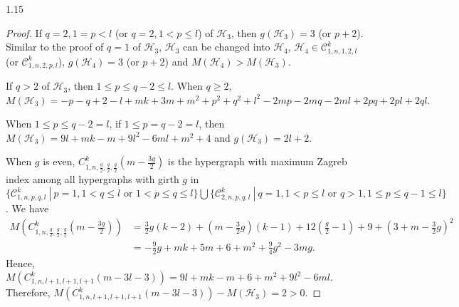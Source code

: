 \documentclass[preprint,12pt]{elsarticle1}
\numberwithin{equation}{section}
\begin{document}
\begin{spacing}{1.15}
\begin{proof}
If $q=2, 1=p<l$ (or $q=2, 1<p\leq l$) of $\mathcal{H}_{3}$, then $g(\mathcal{H}_{3})=3$ (or $p+2$). Similar to the proof of $q=1$ of $\mathcal{H}_{3}$, $\mathcal{H}_{3}$ can be changed into $\mathcal{H}_{4}$,
$\mathcal{H}_{4}\in \mathcal{C}_{1,n,1,2,l}^{k}$ (or $\mathcal{C}_{1,n,2,p,l}^{k}$), $g(\mathcal{H}_{4})=3$ (or $p+2$) and $M(\mathcal{H}_{4})>M(\mathcal{H}_{3})$.



If $q>2$ of $\mathcal{H}_{3}$, then $1\leq p\leq q-2\leq l$.
When $q\geq 2$, $M(\mathcal{H}_{3})=-p-q+2-l+mk+3m+m^{2}+p^{2}+q^{2}+l^{2}-2mp-2mq-2ml+2pq+2pl+2ql.$

When $1\leq p\leq q-2=l$, if $1\leq p=q-2=l$, then $M(\mathcal{H}_{3})=9l+mk-m+9l^{2}-6ml+m^{2}+4$ and $g(\mathcal{H}_{3})=2l+2.$

When $g$ is even, $C_{1,n,\frac{g}{2},\frac{g}{2},\frac{g}{2}}^{k}(m-\frac{3g}{2})$ is the hypergraph with maximum Zagreb index among all hypergraphs with girth $g$ in $\{\mathcal{C}_{1,n,p,q,l}^{k} ~|~ p=1,1<q\leq l \text{~or~} 1<p\leq q\leq l\} \bigcup \{\mathcal{C}_{2,n,p,q,l}^{k}~|~ q=1,1<p\leq l \text{~or~} q>1, 1\leq p\leq q-1\leq l\} $.
We have
\begin{align*}
M(C_{1,n,\frac{g}{2},\frac{g}{2},\frac{g}{2}}^{k}(m-\frac{3g}{2}))&=\frac{3}{2}g(k-2)+(m-\frac{3}{2}g)(k-1)+12(\frac{g}{2}-1)+9+(3+m-\frac{3}{2}g)^{2}\\
&=-\frac{9}{2}g+mk+5m+6+m^{2}+\frac{9}{4}g^{2}-3mg.
\end{align*}
Hence, $M(C_{1,n,l+1,l+1,l+1}^{k}(m-3l-3))=9l+mk-m+6+m^{2}+9l^{2}-6ml.$ Therefore, $M(C_{1,n,l+1,l+1,l+1}^{k}(m-3l-3))-M(\mathcal{H}_{3})=2>0$.


\end{proof}
\end{spacing}
\end{document}
